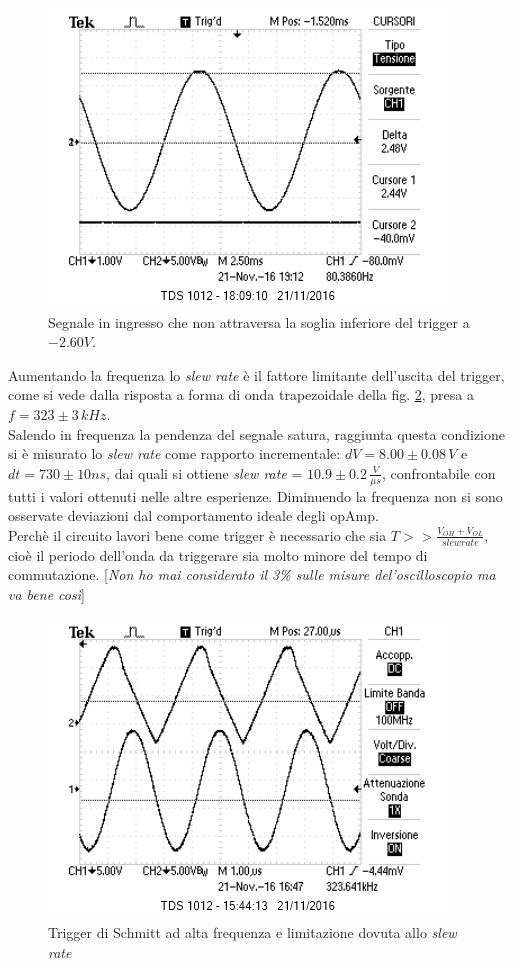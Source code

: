 \documentclass[10pt,a4paper]{article}
\newcommand{\rem}[1]{[\emph{#1}]}
\begin{document}
\begin{figure}[h]
\centering
\includegraphics[scale=1.0]{immagini/sottoSogliaInferiore.png}
\caption{Segnale in ingresso che non attraversa la soglia inferiore del trigger a $-2.60V$.}
\label{sottoSoglia}
\end{figure}

Aumentando la frequenza  lo \emph{slew rate} è il fattore limitante dell'uscita del trigger, come si vede dalla risposta a forma di onda trapezoidale della fig. \ref{slew}, presa a $f = 323 \pm 3 \, kHz$. \\
Salendo in frequenza la pendenza del segnale satura, raggiunta questa condizione si è misurato lo \emph{slew rate} come rapporto incrementale: $dV = 8.00 \pm 0.08 \, V$ e $dt = 730 \pm 10 ns$, dai quali si ottiene \emph{slew rate} = $10.9 \pm 0.2 \, \frac{V}{\mu s}$, confrontabile con tutti i valori ottenuti nelle altre esperienze. Diminuendo la frequenza non si sono osservate deviazioni dal comportamento ideale degli opAmp. \\
Perchè il circuito lavori bene come trigger è necessario che sia $T >> \frac{V_{OH}+V_{OL}}{slew rate}$, cioè il periodo dell'onda da triggerare sia molto minore del tempo di commutazione.
\rem{Non ho mai considerato il 3\% sulle misure del'oscilloscopio ma va bene così}

\begin{figure}[h]
\centering
\includegraphics[scale=1.0]{immagini/slewRate.png}
\caption{Trigger di Schmitt ad alta frequenza e limitazione dovuta allo \emph{slew rate}}
\label{slew}
\end{figure}
\end{document}
